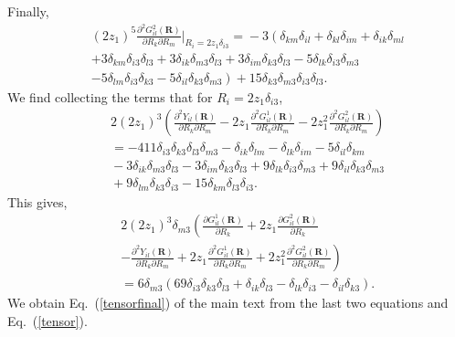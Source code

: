 Finally,
\begin{eqnarray}&&\!\!\!\!\!\!\!\!
(2z_1)^5\frac{\partial^2 G^2_{il}(\bm R)}{\partial R_k \partial R_m}|_{R_i=2z_1\delta_{i3}}\!=\!-3\left(\delta_{km}\delta_{il}\!+\!\delta_{kl}\delta_{im}\!+\!\delta_{ik}\delta_{ml}
\right.\nonumber\\&&\!\!\!\!\!\!\!\!\left.
+3\delta_{km}\delta_{i3}\delta_{l3}\!+\!3\delta_{ik}\delta_{m3}\delta_{l3}+3\delta_{im}\delta_{k3}\delta_{l3}-5\delta_{lk}\delta_{i3}\delta_{m3}
\right.\nonumber\\&&\!\!\!\!\!\!\!\!\left.
-5\delta_{lm}\delta_{i3}\delta_{k3}-5\delta_{il}\delta_{k3}\delta_{m3}\right)+\!15\delta_{k3}\delta_{m3}\delta_{i3}\delta_{l3}.
\end{eqnarray}
We find collecting the terms that for $R_i=2z_1\delta_{i3}$,
\begin{eqnarray}&&\!\!\!\!\!\!\!\!
2(2z_1)^3\left(\frac{\partial^2 Y_{il}(\bm R)}{\partial R_k \partial R_m}\!-\!2z_1\frac{\partial^2 G^1_{il}(\bm R)}{\partial R_k \partial R_m}
\!-\!2z_1^2\frac{\partial^2 G^2_{il}(\bm R)}{\partial R_k \partial R_m}\right)\nonumber\\&&\!\!\!\!\!\!\!\!
=-411\delta_{i3}\delta_{k3}\delta_{l3}\delta_{m3}-\delta_{ik}\delta_{lm}-\delta_{lk}\delta_{im}-5\delta_{il}\delta_{km}
\nonumber\\&&\!\!\!\!\!\!\!\!
-3\delta_{ik}\delta_{m3}\delta_{l3}-3\delta_{im}\delta_{k3}\delta_{l3}+9\delta_{lk}\delta_{i3}\delta_{m3}+9\delta_{il}\delta_{k3}\delta_{m3}
\nonumber\\&&\!\!\!\!\!\!\!\!
+9\delta_{lm}\delta_{k3}\delta_{i3}-15\delta_{km}\delta_{l3}\delta_{i3}.
\end{eqnarray}
This gives,
\begin{eqnarray}&&\!\!\!\!\!\!\!\!
2(2z_1)^3\delta_{m3}\left(\frac{\partial G^1_{il}(\bm R)}{\partial R_k}+2z_1\frac{\partial G^2_{il}(\bm R)}{\partial R_k}
\right.\nonumber\\&&\!\!\!\!\!\!\!\!\!\!\left.
-\frac{\partial^2 Y_{il}(\bm R)}{\partial R_k \partial R_m}\!+\!2z_1\frac{\partial^2 G^1_{il}(\bm R)}{\partial R_k \partial R_m}
\!+\!2z_1^2\frac{\partial^2 G^2_{il}(\bm R)}{\partial R_k \partial R_m}\right)\nonumber\\&&\!\!\!\!\!\!\!\!\!\!
=6\delta_{m3}\left(69\delta_{i3}\delta_{k3}\delta_{l3}
+\delta_{ik}\delta_{l3}-\delta_{lk}\delta_{i3}-\delta_{il}\delta_{k3}\right).
\end{eqnarray}
We obtain Eq.~(\ref{tensorfinal}) of the main text from the last two equations and Eq.~(\ref{tensor}).


\fi
